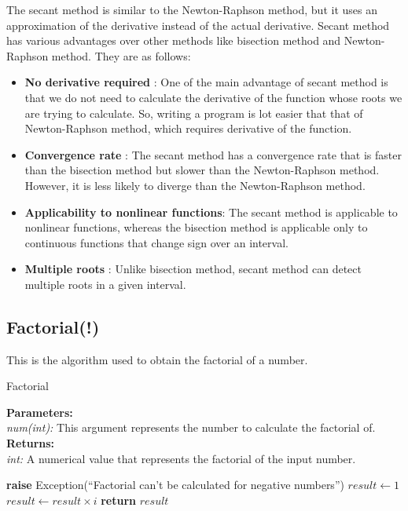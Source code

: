     \begin{flushleft}
      The secant method is similar to the Newton-Raphson method, but it uses an approximation of the derivative instead of the actual derivative. Secant method has various advantages over other methods like bisection method and Newton-Raphson method. They are as follows:
      \begin{itemize}
        \item \textbf{No derivative required} : One of the main advantage of secant method is that we do not need to calculate the derivative of the function whose roots we are trying to calculate. So, writing a program is lot easier that that of Newton-Raphson method, which requires derivative of the function.
        \item \textbf{Convergence rate} : The secant method has a convergence rate that is faster than the bisection method but slower than the Newton-Raphson method. However, it is less likely to diverge than the Newton-Raphson method.
        \item \textbf{Applicability to nonlinear functions}: The secant method is applicable to nonlinear functions, whereas the bisection method is applicable only to continuous functions that change sign over an interval.
        \item \textbf{Multiple roots} : Unlike bisection method, secant method can detect multiple roots in a given interval.
      \end{itemize}
    \end{flushleft}

\subsection{Factorial(!)}
  \begin{flushleft}
    This is the algorithm used to obtain the factorial of a number.
  \end{flushleft}
  \begin{algorithm}
    \caption{Factorial}\label{factorial}
    \begin{tabbing}
      \textbf{Parameters:}\\
        \hspace{1em}\textit{num(int):} This argument represents the number to calculate the factorial of.\\
      
      \textbf{Returns:}\\
        \hspace{1em}\textit{int:} A numerical value that represents the factorial of the input number. \\
    \end{tabbing}
  \begin{algorithmic}[1]
        \State \textbf{raise} Exception(``Factorial can't be calculated for negative numbers'')
      \EndIf
      \State $result \gets 1$
        \State $result \gets result \times i$
      \EndFor
      \State \textbf{return} $result$
    \EndFunction
    \end{algorithmic}
  \end{algorithm}

